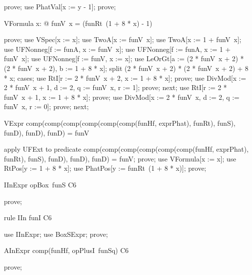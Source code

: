 \documentclass{article}
\begin{document}
\begin{zproof}
prove;
use PhatVal[x := y - 1];
prove;
\end{zproof}

\begin{theorem}{VFormula}
  \forall x: \nat @ funV~x = (funRt~(1 + 8 * x) - 1) 
\end{theorem}

\begin{zproof}
prove;
use VSpec[x := x];
use TwoA[x := funV~x];
use TwoA[x := 1 + funV~x];
use UFNonneg[f := funA, x := funV~x];
use UFNonneg[f := funA, x := 1 + funV~x];
use UFNonneg[f := funV, x := x];
use LeOrGt[a := (2 * funV~x + 2) * (2 * funV~x + 2), b := 1 + 8 * x];
split (2 * funV~x + 2) * (2 * funV~x + 2)  + 8 * x;
cases;
use RtI[r := 2 * funV~x + 2, x := 1 + 8 * x];
prove;
use DivMod[x := 2 * funV~x + 1, d := 2, q := funV~x, r := 1];
prove;
next;
use RtI[r := 2 * funV~x + 1, x := 1 + 8 * x];
prove;
use DivMod[x := 2 * funV~x, d := 2, q := funV~x, r := 0];
prove;
next;
\end{zproof}

\begin{theorem}{VExpr}
  comp(comp(comp(comp(comp(comp(funHf, exprPhat), funRt), funS), funD), funD), funD) = funV
\end{theorem}

\begin{zproof}
apply UFExt to predicate comp(comp(comp(comp(comp(comp(funHf, exprPhat), funRt), funS), funD), funD), funD) = funV;
prove;
use VFormula[x := x];
use RtPos[y := 1 + 8 * x];
use PhatPos[y := funRt~(1 + 8 * x)];
prove;
\end{zproof}

\begin{theorem}{IInExpr}
  opBox~funS \in C6
\end{theorem}

\begin{zproof}
prove;
\end{zproof}

\begin{theorem}{rule IIn}
  funI \in C6
\end{theorem}

\begin{zproof}
use IInExpr;
use BoxSExpr;
prove;
\end{zproof}
\begin{theorem}{AInExpr}
  comp(funHf, opPlusI~funSq) \in C6
\end{theorem}

\begin{zproof}
prove;
\end{zproof}
\end{document}
